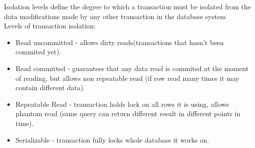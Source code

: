 \documentclass{article}
\begin{document}
    Isolation levels define the degree to which a transaction must be 
    isolated from the data modifications made by any other transaction in 
    the database system \\

    Levels of transaction isolation:
    \begin{itemize}
        \item Read uncommitted - allows dirty reads(transactions that hasn't been commited yet).
        \item Read committed   - guarantees that any data read is commited at the moment of reading, but allows non repeatable read
            (if row read many times it may contain different data).
        \item Repeatable Read  - transaction holds lock on all rows it is using, allows phantom read
            (same query can return different result in different points in time).
        \item Serializable     - transaction fully locks whole database it works on.
    \end{itemize}
\end{document}

